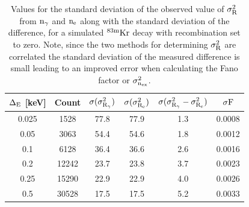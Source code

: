 \begin{table}[h!]
\begin{center}
\begin{tabular}{|c|c|c|c|c|c|}
\hline
$\rm \Delta_E$ [keV] & Count & $\rm \sigma (\sigma_{R_{\gamma}}^2 ) $ & $\rm \sigma (\sigma_{R_{e}}^2 )$  & $\rm \sigma (\sigma_{R_{\gamma}}^2 - \sigma_{R_{e}}^2 ) $ & $\rm \sigma F$ \\ \hline
0.025 	& 1528 		&77.8		& 77.9	  	& 1.3	&	0.0008 \\ \hline
0.05 	& 3063 		&54.4		& 54.6	  	& 1.8	&	0.0012 \\ \hline
0.1 		& 6128  	&36.4		& 36.6		& 2.6	&	0.0016  \\ \hline
0.2 		& 12242  	&23.7		& 23.8	 	& 3.7	&	0.0023 \\ \hline
0.25 	& 15290 	&22.9		& 22.9		& 4.0 	&	0.0026 \\ \hline
0.5		& 30528 	&17.5		& 17.5 		& 5.2	& 	0.0033	 \\ \hline
\end{tabular}
\caption{Values for the standard deviation of the observed value of $\rm \sigma_R^2$ from $\rm n_\gamma$ and $\rm n_e$ along with the standard deviation of the difference, for a simulated $\rm^{83m}Kr$ decay with recombination set to zero.  Note, since the two methods for determining $\rm \sigma_R^2$  are correlated the standard deviation of the measured difference is small leading to an improved error when calculating the Fano factor or $\rm \sigma_{n_{ex}}^2$.}
\label{table:Simulated_Sigmas_R_0}
\end{center}
\end{table}

